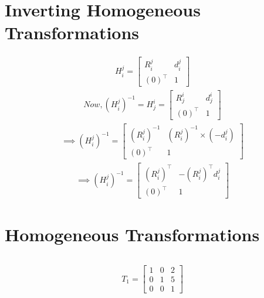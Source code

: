 \documentclass[fleqn]{article}
\begin{document}
\section{Inverting Homogeneous Transformations}
	\begin{adjustwidth}{2em}{0pt}
	\begin{align*} H_i^j = \begin{bmatrix} R_i^j & d_i^j \\ (0)^\intercal & 1 \end{bmatrix} \end{align*}
	\begin{align*} Now, (H_i^j)^{-1} = H_j^i = \begin{bmatrix} R_j^i & d_j^i \\ (0)^\intercal & 1 \end{bmatrix} \end{align*}
	\begin{align*} \implies (H_i^j)^{-1} = \begin{bmatrix} (R_i^j)^{-1} & (R_i^j)^{-1}\times (-d_i^j) \\ (0)^\intercal & 1 \end{bmatrix} \end{align*}
	\begin{align*} \implies (H_i^j)^{-1} = \begin{bmatrix} (R_i^j)^\intercal & -(R_i^j)^\intercal d_i^j \\ (0)^\intercal & 1 \end{bmatrix} \end{align*}
	\end{adjustwidth}

\section{Homogeneous Transformations}

\subsection{ }
	\begin{adjustwidth}{4em}{0pt}
	\begin{align*} T_1 = \begin{bmatrix} 1 & 0 & 2\\0 & 1 & 5\\0 & 0 & 1 \end{bmatrix} \end{align*}
	\end{adjustwidth}
\end{document}

